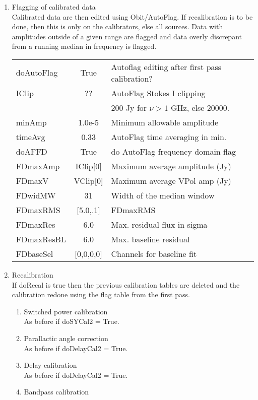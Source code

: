 \documentclass[11pt]{article}
\begin{document}
\begin{enumerate}
\newpage
%
\item Flagging of calibrated data\\
Calibrated data are then edited using Obit/AutoFlag. 
If recalibration is to be done, then this is only on the calibrators,
else all sources.
Data with amplitudes outside of a given range are flagged and data
overly discrepant from a running median in frequency is flagged.
\begin{center}
\begin{tabular}{|l|c|l|}
\hline
doAutoFlag  & True &  Autoflag editing after first pass calibration?\\
IClip  & ?? &  AutoFlag Stokes I clipping\\
 & & 200 Jy for $\nu> 1$ GHz, else 20000. \\
minAmp  & 1.0e-5 & Minimum allowable amplitude \\
timeAvg  & 0.33 &  AutoFlag time averaging in min.\\
doAFFD  & True & do AutoFlag frequency domain flag \\
FDmaxAmp  & IClip[0] &  Maximum average amplitude (Jy)\\
FDmaxV  & VClip[0] &  Maximum average VPol amp (Jy)\\
FDwidMW  & 31 & Width of the median window \\
FDmaxRMS  & [5.0,.1] &  FDmaxRMS\\
FDmaxRes  & 6.0  &  Max. residual flux in sigma\\
FDmaxResBL  & 6.0 &  Max. baseline residual\\
FDbaseSel  & [0,0,0,0] & Channels for baseline fit \\
\hline
\end{tabular}
\end{center}
%
\item Recalibration \\
If doRecal is true then the previous calibration tables are deleted
and the calibration redone using the flag table from the first pass.
\begin{enumerate}
\item Switched power calibration\\
As before if doSYCal2 = True.
\item Parallactic angle correction\\
As before if doDelayCal2 = True.
\item Delay calibration\\
As before if doDelayCal2 = True.
\item Bandpass calibration\\

\end{enumerate}
\end{enumerate}
\end{document}
